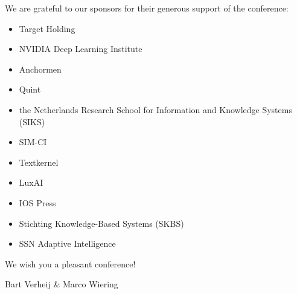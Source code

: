 We are grateful to our sponsors for their generous support of the conference:
\begin{itemize}
%		
	\item 
Target Holding
	\item 
NVIDIA Deep Learning Institute
%
	\item 
Anchormen
	\item 
Quint
	\item 
the Netherlands Research School for Information and Knowledge Systems (SIKS)
	\item 
SIM-CI
%
	\item 
Textkernel
	\item 
LuxAI
	\item 
IOS Press
	\item 
Stichting Knowledge-Based Systems (SKBS)
	\item 
SSN Adaptive Intelligence 
\end{itemize}

\noindent 
We wish you a pleasant conference!

\begin{flushright}
Bart Verheij \& Marco Wiering
\end{flushright}